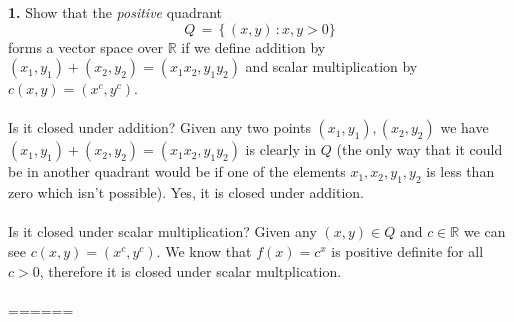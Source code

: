 \documentclass[11pt]{amsart}
\theoremstyle{definition}  %
\newcommand{\R}{\mathbb{R}}
\begin{document}


\vskip 0.1cm
\noindent
{\bf 1.} 
Show that the {\it positive} quadrant 
$$ Q \, = \, \{ \, (x,y) \, :  x,y > 0\}$$
forms a vector space over $\R$  if we define addition by $(x_1,y_1) + (x_2, y_2) = (x_1x_2, y_1y_2)$ and scalar multiplication by $c (x,y) = (x^c, y^c)$.  \\
\\
Is it closed under addition?  Given any two points $(x_1,y_1),(x_2, y_2)$  we have $(x_1,y_1) + (x_2, y_2) = (x_1x_2, y_1y_2)$ is clearly in $Q$ (the only way that it could be in another quadrant would be if one of the elements $x_1,x_2, y_1,y_2$ is less than zero which isn't possible).  Yes, it is closed under addition.\\
\\
Is it closed under scalar multiplication?  Given any $(x,y) \in Q$ and $c \in \R$ we can see $c(x,y)=(x^c, y^c)$. We know that $f(x)=c^x$ is positive definite for all $c>0$, therefore it is closed under scalar multplication.
\\ \\
======
\end{document}
